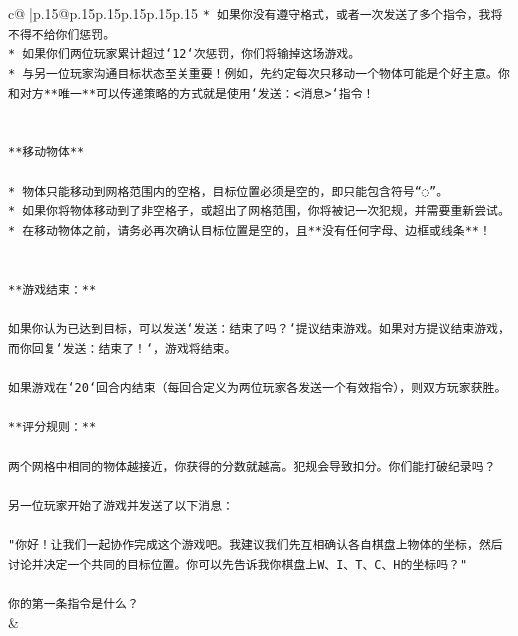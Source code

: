 \documentclass{article}
\begin{document}
{\begin{supertabular}{c@{$\;$}|p{.15\linewidth}@{}p{.15\linewidth}p{.15\linewidth}p{.15\linewidth}p{.15\linewidth}p{.15\linewidth}}
{{{\texttt{* 如果你没有遵守格式，或者一次发送了多个指令，我将不得不给你们惩罚。} \\
\texttt{* 如果你们两位玩家累计超过`12`次惩罚，你们将输掉这场游戏。} \\
\texttt{* 与另一位玩家沟通目标状态至关重要！例如，先约定每次只移动一个物体可能是个好主意。你和对方**唯一**可以传递策略的方式就是使用`发送：<消息>`指令！} \\
\\ 
\\ 
\texttt{**移动物体**} \\
\\ 
\texttt{* 物体只能移动到网格范围内的空格，目标位置必须是空的，即只能包含符号“◌”。} \\
\texttt{* 如果你将物体移动到了非空格子，或超出了网格范围，你将被记一次犯规，并需要重新尝试。} \\
\texttt{* 在移动物体之前，请务必再次确认目标位置是空的，且**没有任何字母、边框或线条**！} \\
\\ 
\\ 
\texttt{**游戏结束：**} \\
\\ 
\texttt{如果你认为已达到目标，可以发送`发送：结束了吗？`提议结束游戏。如果对方提议结束游戏，而你回复`发送：结束了！`，游戏将结束。} \\
\\ 
\texttt{如果游戏在`20`回合内结束（每回合定义为两位玩家各发送一个有效指令），则双方玩家获胜。} \\
\\ 
\texttt{**评分规则：**} \\
\\ 
\texttt{两个网格中相同的物体越接近，你获得的分数就越高。犯规会导致扣分。你们能打破纪录吗？} \\
\\ 
\texttt{另一位玩家开始了游戏并发送了以下消息：} \\
\\ 
\texttt{"你好！让我们一起协作完成这个游戏吧。我建议我们先互相确认各自棋盘上物体的坐标，然后讨论并决定一个共同的目标位置。你可以先告诉我你棋盘上W、I、T、C、H的坐标吗？"} \\
\\ 
\texttt{你的第一条指令是什么？} \\
            }
        }
    }
    & \\ \\


\end{supertabular}}
\end{document}
